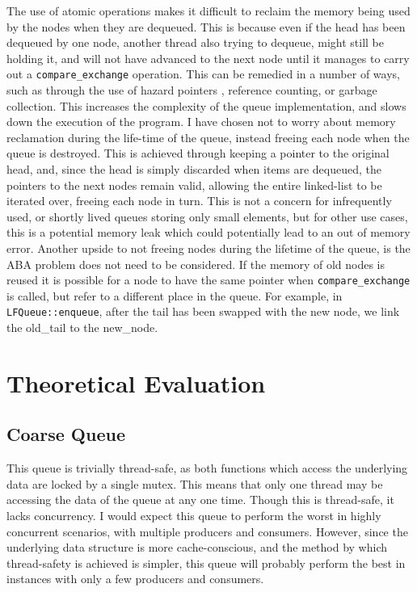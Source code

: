 \documentclass{article}
\begin{document}
The use of atomic operations makes it difficult to reclaim the memory being used
by the nodes when they are dequeued. This is because even if the head has been
dequeued by one node, another thread also trying to dequeue, might still be
holding it, and will not have advanced to the next node until it manages to
carry out a \verb|compare_exchange| operation. This can be remedied in a number
of ways, such as through the use of hazard pointers \citep{michael2004hazard},
reference counting, or garbage collection. This increases the complexity of the
queue implementation, and slows down the execution of the program. I have chosen
not to worry about memory reclamation during the life-time of the queue, instead
freeing each node when the queue is destroyed. This is achieved through keeping
a pointer to the original head, and, since the head is simply discarded when
items are dequeued, the pointers to the next nodes remain valid, allowing the
entire linked-list to be iterated over, freeing each node in turn. This is not a
concern for infrequently used, or shortly lived queues storing only small
elements, but for other use cases, this is a potential memory leak which could
potentially lead to an out of memory error. Another upside to not freeing nodes
during the lifetime of the queue, is the ABA problem does not need to be
considered. If the memory of old nodes is reused it is possible for a node to
have the same pointer when \verb|compare_exchange| is called, but refer to a
different place in the queue. For example, in \verb|LFQueue::enqueue|, after the
tail has been swapped with the new node, we link the old\_tail to the new\_node.

\section{Theoretical Evaluation}
\subsection{Coarse Queue}
This queue is trivially thread-safe, as both functions which access the
underlying data are locked by a single mutex. This means that only one thread
may be accessing the data of the queue at any one time. Though this is
thread-safe, it lacks concurrency. I would expect this queue to perform the
worst in highly concurrent scenarios, with multiple producers and consumers.
However, since the underlying data structure is more cache-conscious, and the
method by which thread-safety is achieved is simpler, this queue will probably
perform the best in instances with only a few producers and consumers.
\end{document}
